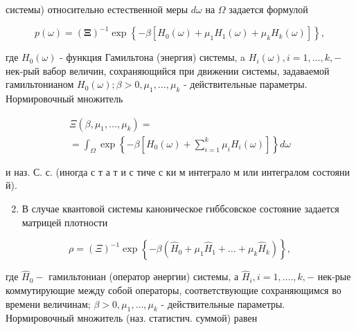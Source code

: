 \documentclass[10pt]{article}
\begin{document}
системы) относительно естественной меры $d \omega$ на $\Omega$ задается формулой



\[

p(\omega)=(\boldsymbol{\Xi})^{-1} \exp \left\{-\beta\left[H_{0}(\omega)+\mu_{1} H_{1}(\omega)+\mu_{k} H_{k}(\omega)\right]\right\},

\]



где $H_{0}(\omega)$ - функция Гамильтона (энергия) системы, a $H_{i}(\omega), i=1, \ldots, k,-$ нек-рый вабор величин, сохраняющийся при движении системы, задаваемой гамильтонианом $H_{0}(\omega) ; \beta>0, \mu_{1}, \ldots, \mu_{k}$ - действительные параметры. Нормировочный множитель



\[

\begin{gathered}

\Xi\left(\beta, \mu_{1}, \ldots, \mu_{k}\right)= \\

=\int_{\Omega} \exp \left\{-\beta\left[H_{0}(\omega)+\sum_{i=1}^{k} \mu_{i} H_{i}(\omega)\right]\right\} d \omega

\end{gathered}

\]



и наз. С. с. (иногда с т а т и с тиче с ки м интеграло м или интегралом состояни й).



\begin{enumerate}

  \setcounter{enumi}{1}

  \item В случае квантовой системы каноническое гиббсовское состояние задается матрицей плотности

\end{enumerate}



\[

\rho=(\Xi)^{-1} \exp \left\{-\beta\left(\hat{H}_{0}+\mu_{1} \hat{H}_{1}+\ldots+\mu_{k} \hat{H}_{k}\right)\right\},

\]



где $\hat{H}_{0}-$ гамильтониан (оператор әнергии) системы, а $\hat{H}_{i}, i=1, \ldots ., k,-$ нек-рые коммутирующие между собой операторы, соответствующие сохраняющимся во времени величинам; $\beta>0, \mu_{1}, \ldots, \mu_{k}$ - действительные параметры. Нормировочный множитель (наз. статистич. суммой) равен
\end{document}
